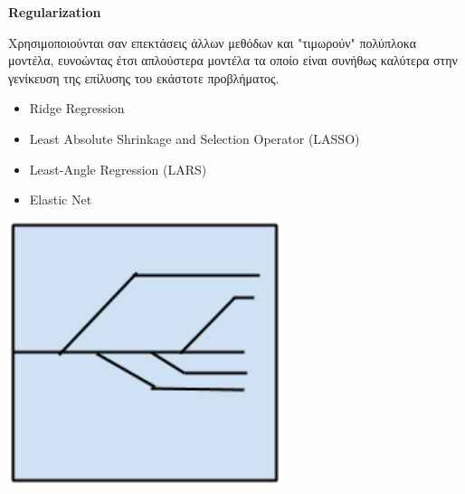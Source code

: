 \begin{minipage}{0.5\textwidth}  %

  \textbf{\large Regularization}

  Χρησιμοποιούνται σαν επεκτάσεις άλλων μεθόδων και
  "τιμωρούν" πολύπλοκα μοντέλα, ευνοώντας έτσι
  απλούστερα μοντέλα τα οποίο είναι συνήθως καλύτερα στην γενίκευση της
  επίλυσης του εκάστοτε προβλήματος.
  \begin{itemize}
    \setlength\itemsep{0em}
    \item{Ridge Regression}
    \item{Least Absolute Shrinkage and Selection Operator (LASSO)}
    \item{Least-Angle Regression (LARS)}
    \item{Elastic Net}
  \end{itemize}
\end{minipage}
\begin{minipage}{0.5\textwidth}
  \begin{center}
    \includegraphics[width=0.6\textwidth]{./images/chapter3/regularization_algorithms.png}
  \end{center}
\end{minipage}

